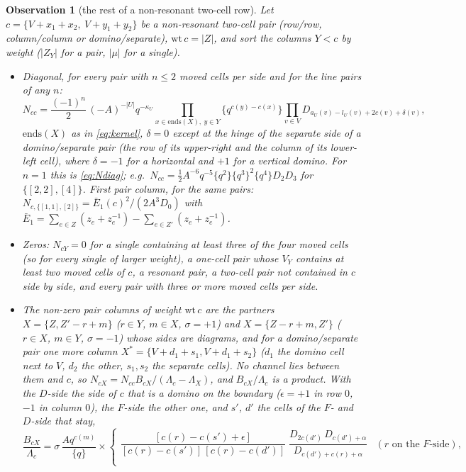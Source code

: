\documentclass[11pt]{article}
\newtheorem{observation}{Observation}
\newcommand{\Lam}{\Lambda}
\begin{document}
\begin{observation}[the rest of a non-resonant two-cell row]\label{obs:twocell}
Let $c=\{V+x_1+x_2,\ V+y_1+y_2\}$ be a non-resonant two-cell pair (row/row, column/column or domino/separate),
$\mathrm{wt}\,c=|Z|$, and sort the columns $Y<c$ by weight ($|Z_Y|$ for a pair, $|\mu|$ for a single).
\begin{itemize}
\item[(D)] Diagonal, for every pair with $n\le2$ moved cells per side and for the line pairs of any $n$:
\begin{equation}\label{eq:pdiag}
N_{cc}=\frac{(-1)^n}{2}\,(-A)^{-|U|}q^{-\kappa_U}\prod_{x\in\mathrm{ends}(X),\ y\in Y}\{q^{c(y)-c(x)}\}
\prod_{v\in V}D_{a_U(v)-l_U(v)+2c(v)+\delta(v)},
\end{equation}
$\mathrm{ends}(X)$ as in \eqref{eq:kernel}, $\delta=0$ except at the hinge of the separate side of a domino/separate pair
(the row of its upper-right and the column of its lower-left cell), where $\delta=-1$ for a horizontal and $+1$ for a
vertical domino.  For $n=1$ this is \eqref{eq:Ndiag}; e.g.\ $N_{cc}=\frac12A^{-6}q^{-5}\{q^2\}\{q^3\}^2\{q^4\}D_2D_3$ for
$\{[2,2],[4]\}$.  First pair column, for the same pairs: $N_{c,\{[1,1],[2]\}}=\bar E_1(c)^2/(2A^3D_0)$ with
$\bar E_1=\sum_{e\in Z}(z_e+z_e^{-1})-\sum_{e\in Z'}(z_e+z_e^{-1})$.
\item[(Z)] Zeros: $N_{cY}=0$ for a single containing at least three of the four moved cells (so for every single of
larger weight), a one-cell pair whose $V_Y$ contains at least two moved cells of $c$, a resonant pair, a two-cell pair
not contained in $c$ side by side, and every pair with three or more moved cells per side.
\item[(P)] The non-zero pair columns of weight $\mathrm{wt}\,c$ are the \emph{partners} $X=\{Z,Z'-r+m\}$ ($r\in Y$,
$m\in X$, $\sigma=+1$) and $X=\{Z-r+m,Z'\}$ ($r\in X$, $m\in Y$, $\sigma=-1$) whose sides are diagrams, and for a
domino/separate pair one more column $X^*=\{V+d_1+s_1,V+d_1+s_2\}$ ($d_1$ the domino cell next to $V$, $d_2$ the other,
$s_1,s_2$ the separate cells).  No channel lies between them and $c$, so $N_{cX}=N_{cc}B_{cX}/(\Lam_c-\Lam_X)$, and
$B_{cX}/\Lam_c$ is a product.  With the $D$-side the side of $c$ that is a domino on the boundary ($\epsilon=+1$ in row $0$,
$-1$ in column $0$), the $F$-side the other one, and $s'$, $d'$ the cells of the $F$- and $D$-side that stay,
\[
\frac{B_{cX}}{\Lam_c}=\sigma\,\frac{Aq^{c(m)}}{\{q\}}\times
\begin{cases}
\dfrac{[c(r)-c(s')+\epsilon]}{[c(r)-c(s')]\,[c(r)-c(d')]}\;\dfrac{D_{2c(d')}\,D_{c(d')+\alpha}}{D_{c(d')+c(r)+\alpha}} & (r\text{ on the $F$-side}),\\[12pt]

\end{cases}\]
\end{itemize}
\end{observation}
\end{document}

